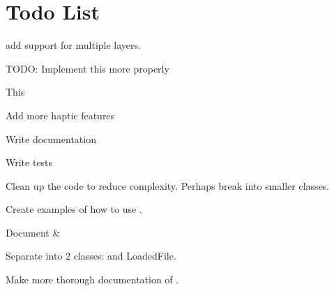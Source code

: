 \chapter{Todo List}
\hypertarget{todo}{}\label{todo}

\begin{DoxyRefList}
\item[Member \doxylink{class_atlas_1_1abstract_a7f6e5dc79241315ff8753e3ea3fbf3d2}{Atlas\+::abstract\texorpdfstring{$<$}{<} Console\+Sink \texorpdfstring{$>$}{>}\+::depth} ]\label{todo__todo000008}%
%
add support for multiple layers.  
\item[Member \doxylink{namespace_atlas_afa2a252b78c0821fed0a608c60cfd2f0}{Atlas\+::Default\+Physics\+Trace} (const char \texorpdfstring{$\ast$}{*}in\+FMT,...)]\label{todo__todo000009}%
%
TODO\+: Implement this more properly  
\item[Class \doxylink{class_atlas_1_1_localization_registry}{Atlas\+::Localization\+Registry} ]\label{todo__todo000007}%
%
This  
\item[File \doxylink{_common_8h}{Common.h} ]\label{todo__todo000001}%
%
Add more haptic features 
\item[File \doxylink{_file_system_registry_8h}{File\+System\+Registry.h} ]\label{todo__todo000004}%
%
Write documentation 



Write tests 



Clean up the code to reduce complexity. Perhaps break into smaller classes.  
\item[File \doxylink{_input_8h}{Input.h} ]\label{todo__todo000006}%
%
Create examples of how to use . 



Document  \&   
\item[File \doxylink{_registered_file_8h}{Registered\+File.h} ]\label{todo__todo000005}%
%
Separate  into 2 classes\+:  and Loaded\+File. 



Make more thorough documentation of . 
\end{DoxyRefList}